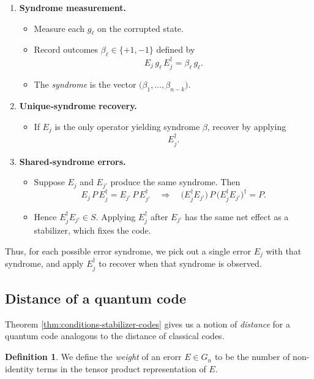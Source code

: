 \documentclass[11pt,a4paper]{article}
\theoremstyle{definition}
\newtheorem{definition}{Definition}[section]
\theoremstyle{plain}
\theoremstyle{remark}
\begin{document}
\begin{enumerate}
  \item \textbf{Syndrome measurement.}
    \begin{itemize}
      \item Measure each \(g_\ell\) on the corrupted state.
      \item Record outcomes \(\beta_\ell\in\{+1,-1\}\) defined by
      \[
        E_j\,g_\ell\,E_j^\dagger = \beta_\ell\,g_\ell.
      \]
      \item The \emph{syndrome} is the vector \(\bigl(\beta_1,\dots,\beta_{n-k}\bigr)\).
    \end{itemize}

  \item \textbf{Unique‐syndrome recovery.}
    \begin{itemize}
      \item If \(E_j\) is the only operator yielding syndrome \(\beta\), recover by applying
      \[
        E_j^\dagger.
      \]
    \end{itemize}

  \item \textbf{Shared‐syndrome errors.}
    \begin{itemize}
      \item Suppose \(E_j\) and \(E_{j'}\) produce the same syndrome.  Then
      \[
        E_j\,P\,E_j^\dagger = E_{j'}\,P\,E_{j'}^\dagger
        \quad\Longrightarrow\quad
        \bigl(E_j^\dagger E_{j'}\bigr)\,P\,\bigl(E_j^\dagger E_{j'}\bigr)^\dagger = P.
      \]
      \item Hence \(E_j^\dagger E_{j'}\in S\).  Applying \(E_j^\dagger\) after \(E_{j'}\) has the same net effect as a stabilizer, which fixes the code.
    \end{itemize}
\end{enumerate}
Thus, for each possible error syndrome, we pick out a single error $E_j$ with that syndrome, 
and apply $E_j^\dagger$ to recover when that syndrome is observed. 

\subsection{Distance of a quantum code}
Theorem \ref{thm:conditions-stabilizer-codes} gives us a notion of \emph{distance} for a quantum code 
analogous to the distance of classical codes. 

\begin{definition}
  We define the \emph{weight} of an erorr $E \in G_n$ to be the number of non-identity 
  terms in the tensor product representation of $E$. 
\end{definition}
\end{document}
